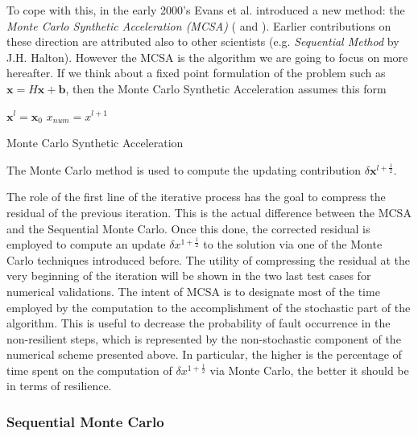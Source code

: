 \documentclass[a4paper,10pt]{article}
\begin{document}
To cope with this, in the early 2000's Evans et al. introduced a new method:
the
\textit{Monte Carlo Synthetic Acceleration (MCSA)}
(\cite{ESW2013} and \cite{EMSH2014}). Earlier contributions on these direction
are attributed also to other scientists (e.g. \textit{Sequential Method} by
J.H. Halton). However the MCSA is the algorithm we are going to focus on more
hereafter. If
we think about a fixed point formulation of the problem
such as $\mathbf{x}=H\mathbf{x}+\mathbf{b}$, then the Monte Carlo Synthetic
Acceleration assumes this form

\begin{algorithm}[H]
 $\mathbf{x}^{l}=\mathbf{x}_0$\;
 $x_{num}=x^{l+1}$\;
 \caption{Monte Carlo Synthetic Acceleration}
\end{algorithm}
The Monte Carlo method is used to compute the updating contribution $\delta
\mathbf{x}^{l+\frac{1}{2}}$.

The role of the first line of the iterative process has the goal to compress
the residual of the previous iteration. This is the actual difference
between the MCSA and the Sequential Monte Carlo. Once this done, the corrected
residual
is employed to compute an update $\delta x^{1+\frac{1}{2}}$ to the solution via
one of the Monte Carlo techniques introduced before. The utility of compressing
the residual at the very beginning of the iteration will be shown in the two
last test cases for numerical validations.
The intent of MCSA is to designate most of the time employed by the
computation to the accomplishment of the stochastic part of the algorithm.
This
is useful to decrease the probability of fault occurrence in the non-resilient
steps, which is represented by the non-stochastic component of the numerical
scheme presented above. In particular, the higher is the percentage of time
spent on the computation of $\delta x^{1+\frac{1}{2}}$ via Monte Carlo, the
better it should be in terms of resilience.

\subsubsection{Sequential Monte Carlo}
\end{document}
